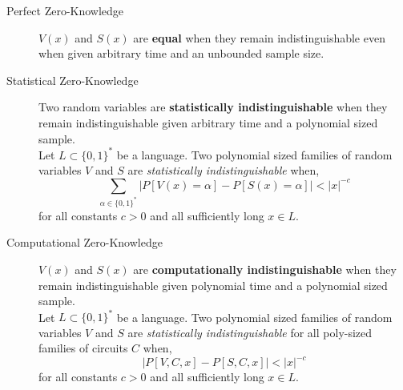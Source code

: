 \begin{description}
	\item[Perfect Zero-Knowledge]
	$V(x)$ and $S(x)$ are \textbf{equal} when they remain indistinguishable even when given arbitrary time and an unbounded sample size.
	
	\newpage
	\item[Statistical Zero-Knowledge] Two random variables are \textbf{statistically indistinguishable} when they remain indistinguishable given arbitrary time and a polynomial sized sample.
	\bigskip
	\\
	Let $L \subset \{0,1\}^*$ be a language. Two polynomial sized families of random variables $V$ and $S$ are \textit{statistically indistinguishable} when,
		\medskip
	$$\sum_{\alpha \in \{0,1\}^*} |P[V(x) = \alpha] - P[S(x) = \alpha]| < |x|^{-c}$$
	for all constants $c>0$ and all sufficiently long $x \in L$.
	
	\item[Computational Zero-Knowledge] $V(x)$ and $S(x)$ are \textbf{computationally indistinguishable} when they remain indistinguishable given polynomial time and a polynomial sized sample.
	\bigskip
	\\
	Let $L \subset \{0,1\}^*$ be a language. Two polynomial sized families of random variables $V$ and $S$ are \textit{statistically indistinguishable} for all poly-sized families of circuits $C$ when,
	\medskip
	$$|P[V, C, x] - P[S, C, x]| < |x|^{-c}$$
	for all constants $c>0$ and all sufficiently long $x \in L$.

\end{description}


